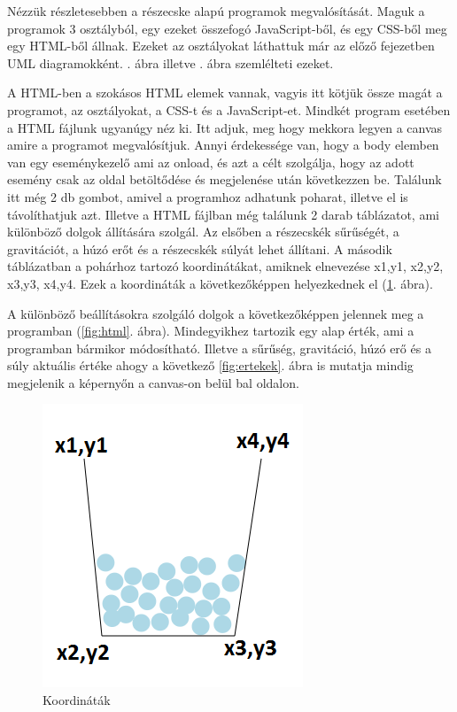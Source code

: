 


Nézzük részletesebben a részecske alapú programok megvalósítását. Maguk a programok 3 osztályból, egy ezeket összefogó JavaScript-ből, és egy CSS-ből meg egy HTML-ből állnak. Ezeket az osztályokat láthattuk már az előző fejezetben UML diagramokként. . ábra illetve . ábra szemlélteti ezeket.


A HTML-ben a szokásos HTML elemek vannak, vagyis itt kötjük össze magát a programot, az osztályokat, a CSS-t és a JavaScript-et. Mindkét program esetében a HTML fájlunk ugyanúgy néz ki. Itt adjuk, meg hogy mekkora legyen a canvas amire a programot megvalósítjuk. Annyi érdekessége van, hogy a body elemben van egy eseménykezelő ami az onload, és azt a célt szolgálja, hogy az adott esemény csak az oldal betöltődése és megjelenése után következzen be.
Találunk itt még 2 db gombot, amivel a programhoz adhatunk poharat, illetve el is távolíthatjuk azt.
Illetve a HTML fájlban még találunk 2 darab táblázatot, ami különböző dolgok állítására szolgál. Az elsőben a részecskék sűrűségét, a gravitációt, a húzó erőt és a részecskék súlyát lehet állítani. 
A második táblázatban a pohárhoz tartozó koordinátákat, amiknek elnevezése x1,y1, x2,y2, x3,y3, x4,y4. Ezek a koordináták a következőképpen helyezkednek el (\ref{fig:pohar}. ábra).

A különböző beállításokra szolgáló dolgok a következőképpen jelennek meg a programban (\ref{fig:html}. ábra). Mindegyikhez tartozik egy alap érték, ami a programban bármikor módosítható. Illetve a sűrűség, gravitáció, húzó erő és a súly aktuális értéke ahogy a  következő \ref{fig:ertekek}. ábra is mutatja mindig megjelenik a képernyőn a canvas-on belül bal oldalon. 

\begin{figure}[h]
	\centering
	\includegraphics[scale=1]{images/pohar.png}
	\caption{Koordináták}
	\label{fig:pohar}
\end{figure}

